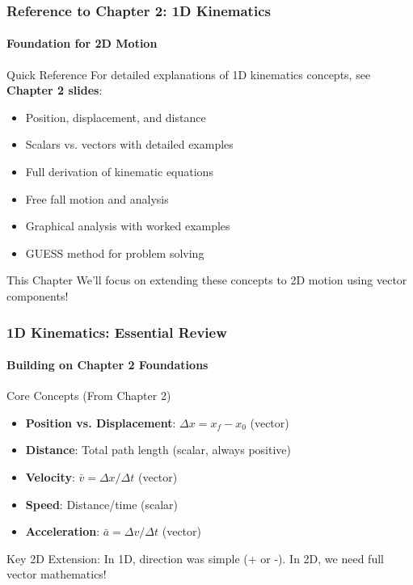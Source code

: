 \documentclass{beamer}
\begin{document}
\begin{frame}
\frametitle{Reference to Chapter 2: 1D Kinematics}
\framesubtitle{Foundation for 2D Motion}
\begin{block}{Quick Reference}
For detailed explanations of 1D kinematics concepts, see \textbf{Chapter 2 slides}:
\begin{itemize}
    \item Position, displacement, and distance
    \item Scalars vs. vectors with detailed examples
    \item Full derivation of kinematic equations
    \item Free fall motion and analysis
    \item Graphical analysis with worked examples
    \item GUESS method for problem solving
\end{itemize}
\end{block}
\begin{alertblock}{This Chapter}
We'll focus on extending these concepts to 2D motion using vector components!
\end{alertblock}
\end{frame}

\begin{frame}
\frametitle{1D Kinematics: Essential Review}
\framesubtitle{Building on Chapter 2 Foundations}
\begin{block}{Core Concepts (From Chapter 2)}
\begin{itemize}
    \item \textbf{Position vs. Displacement}: $\Delta x = x_f - x_0$ (vector)
    \item \textbf{Distance}: Total path length (scalar, always positive)
    \item \textbf{Velocity}: $\bar{v} = \Delta x / \Delta t$ (vector)
    \item \textbf{Speed}: Distance/time (scalar)
    \item \textbf{Acceleration}: $\bar{a} = \Delta v / \Delta t$ (vector)
\end{itemize}
\end{block}
\alert{Key 2D Extension}: In 1D, direction was simple (+ or -). In 2D, we need full vector mathematics!
\end{frame}
\end{document}
